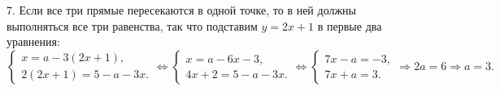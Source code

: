 7. Если все три прямые пересекаются в одной точке, то в ней должны выполняться все три равенства, так что подставим $y=2x+1$ в первые два уравнения:
$\begin{cases} x=a-3(2x+1),\\ 2(2x+1)=5-a-3x.\end{cases}\Leftrightarrow\begin{cases} x=a-6x-3,\\ 4x+2=5-a-3x.\end{cases}\Leftrightarrow
\begin{cases} 7x-a=-3,\\ 7x+a=3.\end{cases}\Rightarrow 2a=6 \Rightarrow a=3.$\\
